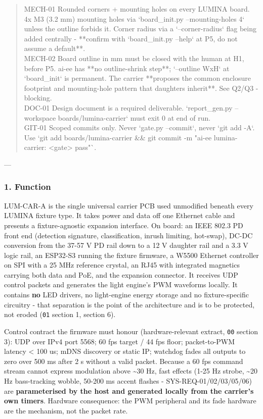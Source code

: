 \documentclass[11pt,a4paper]{article}
\begin{document}
\begin{quote}
\textbar{} MECH-01 \textbar{} Rounded corners + mounting holes on every LUMINA board. \textbar{} 4x M3 (3.2 mm) mounting holes via `board\_init.py --mounting-holes 4` unless the outline forbids it. Corner radius via a `--corner-radius` flag being added centrally - {*}{*}confirm with `board\_init.py --help` at P5, do not assume a default{*}{*}. \textbar{}\\
\textbar{} MECH-02 \textbar{} Board outline in mm must be closed with the human at H1, before P5. \textbar{} ai-ee has {*}{*}no outline-shrink step{*}{*}; `--outline WxH` at `board\_init` is permanent. The carrier {*}{*}proposes the common enclosure footprint and mounting-hole pattern that daughters inherit{*}{*}. See Q2/Q3 - blocking. \textbar{}\\
\textbar{} DOC-01 \textbar{} Design document is a required deliverable. \textbar{} `report\_gen.py --workspace boards/lumina-carrier` must exit 0 at end of run. \textbar{}\\
\textbar{} GIT-01 \textbar{} Scoped commits only. \textbar{} Never `gate.py --commit`, never `git add -A`. Use `git add boards/lumina-carrier \&\& git commit -m "ai-ee lumina-carrier: \textless{}gate\textgreater{} pass"`. \textbar{}
\end{quote}
---

\subsubsection*{1. Function}
LUM-CAR-A is the single universal carrier PCB used unmodified beneath every LUMINA fixture type. It takes power and data off one Ethernet cable and presents a fixture-agnostic expansion interface. On board: an IEEE 802.3 PD front end (detection signature, classification, inrush limiting, hot-swap), DC-DC conversion from the 37-57 V PD rail down to a 12 V daughter rail and a 3.3 V logic rail, an ESP32-S3 running the fixture firmware, a W5500 Ethernet controller on SPI with a 25 MHz reference crystal, an RJ45 with integrated magnetics carrying both data and PoE, and the expansion connector. It receives UDP control packets and generates the light engine's PWM waveforms locally. It contains \textbf{no} LED drivers, no light-engine energy storage and no fixture-specific circuitry - that separation is the point of the architecture and is to be protected, not eroded (\texttt{01} section 1, section 6).

Control contract the firmware must honour (hardware-relevant extract, \texttt{00} section 3): UDP over IPv4 port 5568; 60 fps target / 44 fps floor; packet-to-PWM latency \textless{} 100 us; mDNS discovery or static IP; watchdog fades all outputs to zero over 500 ms after 2 s without a valid packet. Because a 60 fps command stream cannot express modulation above \textasciitilde{}30 Hz, fast effects (1-25 Hz strobe, \textasciitilde{}20 Hz bass-tracking wobble, 50-200 ms accent flashes - SYS-REQ-01/02/03/05/06) are \textbf{parameterised by the host and generated locally from the carrier's own timers}. Hardware consequence: the PWM peripheral and its fade hardware are the mechanism, not the packet rate.
\end{document}
